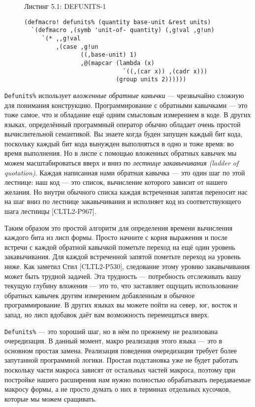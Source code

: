 \begin{figure}Листинг 5.1: DEFUNITS-1\label{listing_5.1}
\listbegin
\begin{verbatim}
(defmacro! defunits% (quantity base-unit &rest units)
  `(defmacro ,(symb 'unit-of- quantity) (,g!val ,g!un)
     `(* ,,g!val
         ,(case ,g!un
                ((,base-unit) 1)
                ,@(mapcar (lambda (x)
                            `((,(car x)) ,(cadr x)))
                          (group units 2))))))
\end{verbatim}
\listend
\end{figure}

\verb"Defunits%" использует \emph{вложенные обратные кавычки} --- чрезвычайно сложную для понимания конструкцию. Программирование с обратными кавычками --- это тоже самое, что и обладание ещё одним смысловым измерением в коде. В других языках, определённый программный оператор обычно обладает очень простой вычислительной семантикой. Вы знаете когда буден запущен каждый бит кода, поскольку каждый бит кода вынужден выполняться в одно и тоже время: во время выполнения. Но в лиспе с помощью вложенных обратных кавычек мы можем масштабироваться вверх и вниз по \emph{лестнице закавычивания (ladder of quotation)}. Каждая написанная нами обратная кавычка --- это один шаг по этой лестнице: наш код --- это список, вычисление которого зависит от нашего желания. Но внутри обычного списка каждая встреченная запятая переносит нас на шаг вниз по лестнице закавычивания и исполняет код из соответствующего шага лестницы [CLTL2-P967].

Таким образом это простой алгоритм для определения времени вычисления каждого бита из лисп формы. Просто начните с корня выражения и после встречи с каждой обратной кавычкой пометьте переход на ещё один уровень закавычивания. Для каждой встреченной запятой пометьте переход на уровень ниже. Как заметил Стил [CLTL2-P530], следование этому уровню закавычивания может быть трудной задачей. Эта трудность --- потребность отслеживать вашу текущую глубину вложения --- это то, что заставляет ощущать использование обратных кавычек другим измерением добавленным в обычное программирование. В других языках вы можете пойти на север, юг, восток и запад, но лисп вдобавок даёт вам возможность перемещаться вверх.

\verb"Defunits%" --- это хороший шаг, но в нём по прежнему не реализована очередизация. В данный момент, макро реализация этого языка --- это в основном простая замена. Реализация поведения очередизации требует более запутанной программной логики. Простая подстановка уже не будет работать поскольку части макроса зависят от остальных частей макроса, поэтому при постройке нашего расширения нам нужно полностью обрабатывать передаваемые макросу формы, а не просто думать о них в терминах отдельных кусочков, которые мы можем сращивать.

